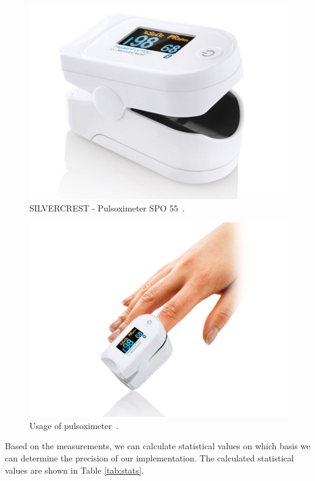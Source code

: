 \documentclass[11pt,a4paper]{article}
\begin{document}
\newpage

\begin{figure}[H]
    \centering
    \includegraphics[scale=0.15]{img/pulsoximeter1.jpg}
    \caption{SILVERCREST - Pulsoximeter SPO 55~\cite{IMG-PULSOXIMETER-1}.}
    \label{fig:pulsoximeter1}
\end{figure}

\begin{figure}[H]
    \centering
    \includegraphics[scale=0.7]{img/pulsoximeter2.jpg}
    \caption{Usage of pulsoximeter~\cite{IMG-PULSOXIMETER-2}.}
    \label{fig:pulsoximeter2}
\end{figure}

Based on the measurements, we can calculate statistical values on which basis we can determine the precision of our implementation. The calculated statistical values are shown in Table \ref{tab:stats}.\\
\end{document}

